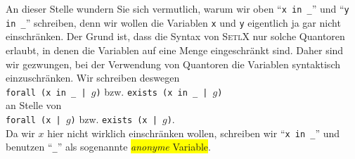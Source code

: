 \remark
 An dieser Stelle wundern Sie sich vermutlich, warum wir oben 
``\texttt{x in \_}'' und ``\texttt{y in \_}'' schreiben, denn wir wollen die Variablen
\texttt{x} und \texttt{y} eigentlich ja gar nicht einschr\"{a}nken.  Der Grund ist, dass die
Syntax von \textsc{SetlX} nur solche Quantoren erlaubt, in denen die Variablen auf eine
Menge eingeschr\"{a}nkt sind.  Daher sind wir gezwungen, bei der Verwendung von Quantoren die
Variablen syntaktisch einzuschr\"{a}nken.  Wir schreiben deswegen 
\\[0.2cm]
\hspace*{1.3cm}
\texttt{forall (x in \_ | $g$)} \quad bzw. \quad
\texttt{exists (x in \_ | $g$)} 
\\[0.2cm]
an Stelle von 
\\[0.2cm]
\hspace*{1.3cm}
\texttt{forall (x | $g$)} \quad bzw. \quad
\texttt{exists (x | $g$)}. 
\\[0.2cm]
Da wir $x$ hier nicht wirklich einschr\"{a}nken wollen, schreiben wir ``\texttt{x in \_}'' und benutzen
``\texttt{\_}'' als sogenannte \colorbox{yellow}{\emph{anonyme} Variable}.
\eox

